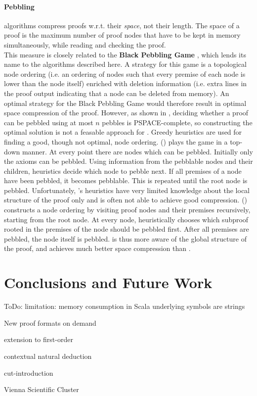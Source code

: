 \documentclass{llncs}
\begin{document}
\paragraph{Pebbling} algorithms \cite{ToDo: cite submitted paper} compress proofs w.r.t. their \emph{space}, not their length. The space of a proof is the maximum number of proof nodes that have to be kept in memory simultaneously, while reading and checking the proof.\\
This measure is closely related to the \textbf{Black Pebbling Game} \cite{gilbert1980pebbling}, which lends its name to the algorithms described here. A strategy for this game is a topological node ordering (i.e. an ordering of nodes such that every premise of each node is lower than the node itself) enriched with deletion information (i.e. extra lines in the proof output indicating that a node can be deleted from memory). An optimal strategy for the Black Pebbling Game would therefore result in optimal space compression of the proof. 
However, as shown in \cite{gilbert1980pebbling}, deciding whether a proof can be pebbled using at most $n$ pebbles is PSPACE-complete, so constructing the optimal solution is not a feasable approach for \skeptik. Greedy heuristics are used for finding a good, though not optimal, node ordering.
 () plays the game in a top-down manner. At every point there are nodes which can be pebbled. Initially only the axioms can be pebbled. Using information from the pebblable nodes and their children, heuristics decide which node to pebble next. If all premises of a node have been pebbled, it becomes pebblable. This is repeated until the root node is pebbled. Unfortunately, 's heuristics have very limited knowledge about the local structure of the proof only and is often not able to achieve good compression.
 () constructs a node ordering by visiting proof nodes and their premises recursively, starting from the root node. At every node,  heuristically chooses which subproof rooted in the premises of the node should be pebbled first. After all premises are pebbled, the node itself is pebbled.  is thus more aware of the global structure of the proof, and achieves much better space compression than .



\section{Conclusions and Future Work}

ToDo: limitation: memory consumption in Scala
underlying symbols are strings

New proof formats on demand

extension to first-order

contextual natural deduction

cut-introduction

Vienna Scientific Cluster



\end{document}
